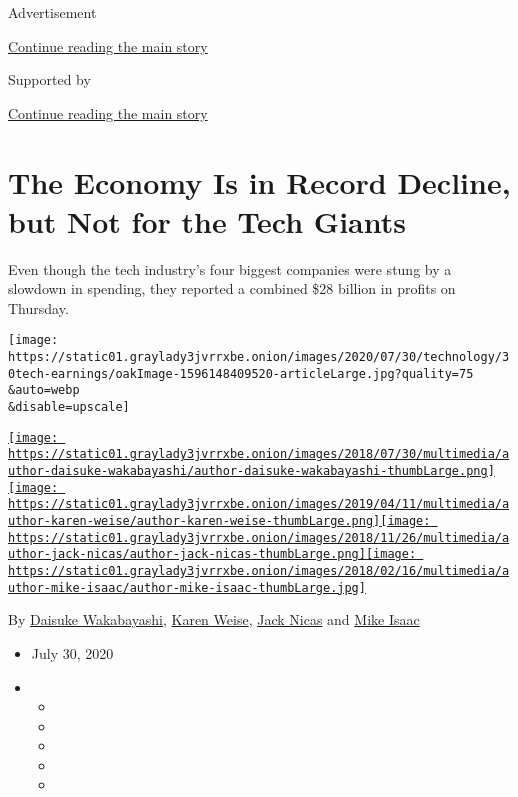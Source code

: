 Advertisement

\protect\hyperlink{after-top}{Continue reading the main story}

Supported by

\protect\hyperlink{after-sponsor}{Continue reading the main story}

\hypertarget{the-economy-is-in-record-decline-but-not-for-the-tech-giants}{%
\section{The Economy Is in Record Decline, but Not for the Tech
Giants}\label{the-economy-is-in-record-decline-but-not-for-the-tech-giants}}

Even though the tech industry's four biggest companies were stung by a
slowdown in spending, they reported a combined \$28 billion in profits
on Thursday.

\texttt{[image: https://static01.graylady3jvrrxbe.onion/images/2020/07/30/technology/30tech-earnings/oakImage-1596148409520-articleLarge.jpg?quality=75\\\&auto=webp\\\&disable=upscale]}

\href{https://www.nytimes3xbfgragh.onion/by/daisuke-wakabayashi}{\texttt{[image: https://static01.graylady3jvrrxbe.onion/images/2018/07/30/multimedia/author-daisuke-wakabayashi/author-daisuke-wakabayashi-thumbLarge.png]}}\href{https://www.nytimes3xbfgragh.onion/by/karen-weise}{\texttt{[image: https://static01.graylady3jvrrxbe.onion/images/2019/04/11/multimedia/author-karen-weise/author-karen-weise-thumbLarge.png]}}\href{https://www.nytimes3xbfgragh.onion/by/jack-nicas}{\texttt{[image: https://static01.graylady3jvrrxbe.onion/images/2018/11/26/multimedia/author-jack-nicas/author-jack-nicas-thumbLarge.png]}}\href{https://www.nytimes3xbfgragh.onion/by/mike-isaac}{\texttt{[image: https://static01.graylady3jvrrxbe.onion/images/2018/02/16/multimedia/author-mike-isaac/author-mike-isaac-thumbLarge.jpg]}}

By
\href{https://www.nytimes3xbfgragh.onion/by/daisuke-wakabayashi}{Daisuke
Wakabayashi},
\href{https://www.nytimes3xbfgragh.onion/by/karen-weise}{Karen Weise},
\href{https://www.nytimes3xbfgragh.onion/by/jack-nicas}{Jack Nicas} and
\href{https://www.nytimes3xbfgragh.onion/by/mike-isaac}{Mike Isaac}

\begin{itemize}
\item
  July 30, 2020
\item
  \begin{itemize}
  \item
  \item
  \item
  \item
  \item
  \end{itemize}
\end{itemize}


